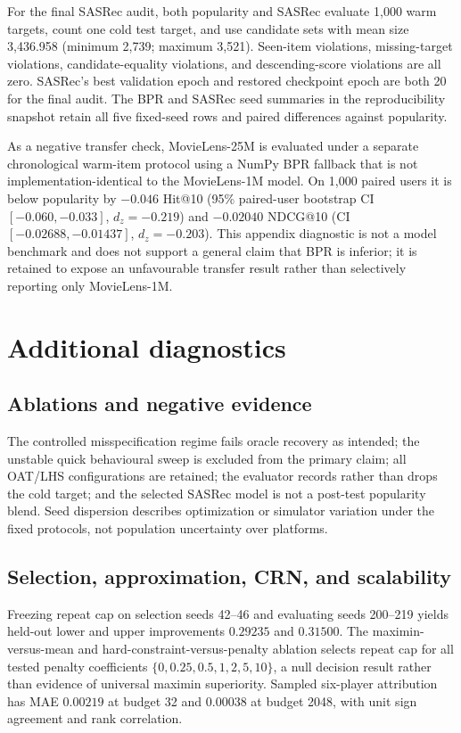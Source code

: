 \documentclass[review]{elsarticle}
\theoremstyle{plain}
\theoremstyle{definition}
\theoremstyle{remark}
\begin{document}
\begin{appendices}
For the final SASRec audit, both popularity and SASRec evaluate 1,000 warm targets, count one cold test target, and use candidate sets with mean size 3,436.958 (minimum 2,739; maximum 3,521). Seen-item violations, missing-target violations, candidate-equality violations, and descending-score violations are all zero. SASRec's best validation epoch and restored checkpoint epoch are both 20 for the final audit. The BPR and SASRec seed summaries in the reproducibility snapshot retain all five fixed-seed rows and paired differences against popularity.

As a negative transfer check, MovieLens-25M is evaluated under a separate chronological warm-item protocol using a NumPy BPR fallback that is not implementation-identical to the MovieLens-1M model. On 1,000 paired users it is below popularity by $-0.046$ Hit@10 (95\% paired-user bootstrap CI $[-0.060,-0.033]$, $d_z=-0.219$) and $-0.02040$ NDCG@10 (CI $[-0.02688,-0.01437]$, $d_z=-0.203$). This appendix diagnostic is not a model benchmark and does not support a general claim that BPR is inferior; it is retained to expose an unfavourable transfer result rather than selectively reporting only MovieLens-1M.

\section{Additional diagnostics}\label{app:additional-diagnostics}

\subsection{Ablations and negative evidence}\label{sec:ablations}
The controlled misspecification regime fails oracle recovery as intended; the unstable quick behavioural sweep is excluded from the primary claim; all OAT/LHS configurations are retained; the evaluator records rather than drops the cold target; and the selected SASRec model is not a post-test popularity blend. Seed dispersion describes optimization or simulator variation under the fixed protocols, not population uncertainty over platforms.

\subsection{Selection, approximation, CRN, and scalability}\label{sec:robustness-extensions}
Freezing repeat cap on selection seeds 42--46 and evaluating seeds 200--219 yields held-out lower and upper improvements $0.29235$ and $0.31500$. The maximin-versus-mean and hard-constraint-versus-penalty ablation selects repeat cap for all tested penalty coefficients $\{0,0.25,0.5,1,2,5,10\}$, a null decision result rather than evidence of universal maximin superiority. Sampled six-player attribution has MAE $0.00219$ at budget 32 and $0.00038$ at budget 2048, with unit sign agreement and rank correlation.


\end{appendices}
\end{document}
